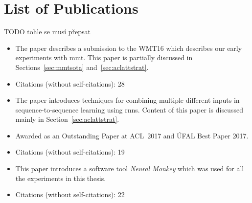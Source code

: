 \chapter*{List of Publications}

TODO tohle se musí přepsat



\noindent{}
\begin{itemize}[noitemsep,topsep=0pt]

    \item The paper describes a submission to the WMT16 which describes our early
        experiments with \gls{mmt}. This paper is partially discussed in
        Sections~\ref{sec:mmtsota} and~\ref{sec:aclattstrat}.

    \item Citations (without self-citations): 28

\end{itemize}\vspace{3mm}


\noindent{}
\begin{itemize}[noitemsep,topsep=0pt]

  \item The paper introduces techniques for combining multiple different inputs in
      sequence-to-sequence learning using \glspl{rnn}. Content of this paper is
        discussed mainly in Section~\ref{sec:aclattstrat}.

  \item Awarded as an Outstanding Paper at ACL~2017 and ÚFAL Best Paper 2017.

  \item Citations (without self-citations): 19

\end{itemize}\vspace{3mm}


\noindent{}
\begin{itemize}[noitemsep,topsep=0pt]

  \item This paper introduces a software tool \emph{Neural Monkey} which was
      used for all the experiments in this thesis.

  \item Citations (without self-citations): 22

\end{itemize}\vspace{3mm}

